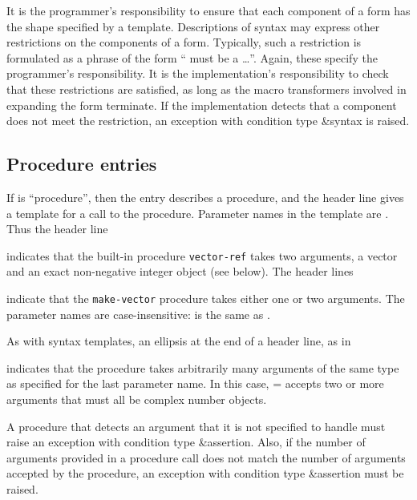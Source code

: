 It is the programmer's responsibility to ensure that each component of
a form has the shape specified by a template.  Descriptions of syntax
may express other restrictions on the components of a form.
Typically, such a restriction is formulated as a phrase of the form
`` must be a \ldots''.  Again, these
specify the programmer's responsibility.  It is the implementation's
responsibility to check that these restrictions are satisfied, as long
as the macro transformers involved in expanding the form terminate.
If the implementation detects that a component does not meet the
restriction, an exception with condition type {\cf\&syntax} is raised.

\subsection{Procedure entries}

If  is ``procedure'', then the entry describes a procedure, and
the header line gives a template for a call to the procedure.  Parameter
names in the template are .  Thus the header line

\noindent{}\unpenalty

indicates that the built-in procedure {\tt vector-ref} takes
two arguments, a vector  and an exact non-negative integer
object  (see below).  The header lines

\noindent%
\unpenalty

indicate that the {\tt make-vector} procedure takes
either one or two arguments.  The parameter names are
case-insensitive:  is the same as .

As with syntax templates, an ellipsis \dotsfoo{} at the end of a header
line, as in

\noindent{}\unpenalty

indicates that the procedure takes arbitrarily many arguments of the
same type as specified for the last parameter name.  In this case,
{\cf =} accepts two or more arguments that must all be complex
number objects.

\label{typeconventions}
A procedure that detects an argument that it is not specified to
handle must raise an exception with condition type
{\cf\&assertion}.  Also, if the
number of arguments provided in a procedure call does not match 
the number of arguments accepted by the procedure, an exception with
condition type {\cf\&assertion} must be raised.

